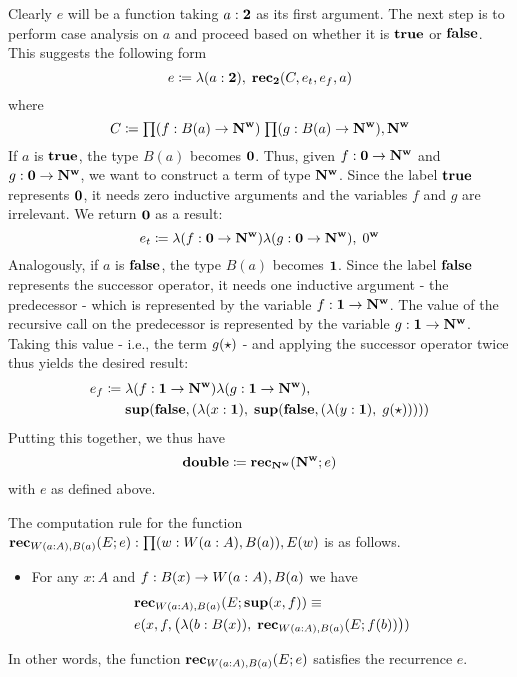 Clearly $e$ will be a function taking $a : \mathbf{2}$ as its first argument. The next step is to perform case analysis on $a$ and proceed based on whether it is $\mathbf{true}$ or $\mathbf{false}$. This suggests the following form
\[ e \coloneqq \lambda(a : \mathbf{2}), \; \mathbf{rec}_\mathbf{2}(C,e_t,e_f,a) \]
where \[C \defeq \prd{f : B(a) \to \natw}{g : B(a) \to \natw} \natw\]
If $a$ is $\mathbf{true}$, the type $B(a)$ becomes $\mathbf{0}$. Thus, given $f : \mathbf{0} \to \mathbf{N^w}$ and $g : \mathbf{0} \to \mathbf{N^w}$, we want to construct a term of type $\mathbf{N^w}$. Since the label $\mathbf{true}$ represents $\mathbf{0}$, it needs zero inductive arguments and the variables $f$ and $g$ are irrelevant. We return $\mathbf{0}$ as a result:
\[ e_t \coloneqq \lambda(f:\mathbf{0} \to \mathbf{N^w})\lambda(g:\mathbf{0} \to \mathbf{N^w}), \; 0^\mathbf{w} \]
Analogously, if $a$ is $\mathbf{false}$, the type $B(a)$ becomes $\mathbf{1}$. Since the label $\mathbf{false}$ represents the successor operator, it needs one inductive argument - the predecessor - which is represented by the variable $f : \mathbf{1} \to \mathbf{N^w}$. The value of the recursive call on the predecessor is represented by the variable $g : \mathbf{1} \to \mathbf{N^w}$. Taking this value - i.e., the term $g(\star)$ - and applying the successor operator twice thus yields the desired result:
\begin{align*}
 e_f \coloneqq & \; \lambda(f:\mathbf{1} \to \mathbf{N^w})\lambda(g:\mathbf{1} \to \mathbf{N^w}), \\
  & \; \mathbf{sup}(\mathbf{false}, (\lambda (x:\mathbf{1}), \; \mathbf{sup}(\mathbf{false}, (\lambda (y : \mathbf{1}), \; g(\star)))))
\end{align*}
Putting this together, we thus have
\[ \mathbf{double} \coloneqq \mathbf{rec}_\mathbf{N^w}(\mathbf{N^w}; e) \]
with $e$ as defined above.

The computation rule for the function $\rec_{\wtype{a:A} B(a)}(E;e) : \prd{w : \wtype{a:A} B(a)} E(w)$ is as follows.
\begin{itemize}
\item For any $x : A$ and $f : B(x) \to W(a:A), B(a)$ we have 
\begin{align*}
& \mathbf{rec}_{W(a:A), B(a)}(E;\mathbf{sup}(x,f)) \equiv \\ & e(x,f,\big(\lambda (b : B(x)), \; \mathbf{rec}_{W(a:A), B(a)}(E;f(b))\big))
\end{align*}
\end{itemize}
In other words, the function $\mathbf{rec}_{W(a:A), B(a)}(E;e)$ satisfies the recurrence $e$.

